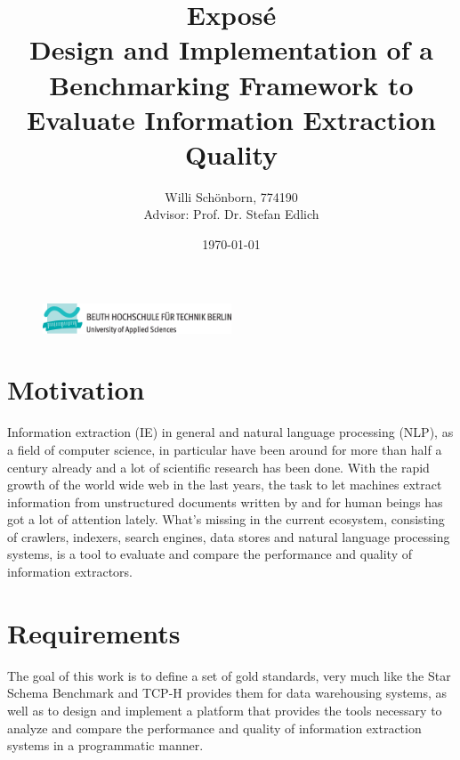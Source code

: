 \documentclass[a4paper]{article}
\title{\textbf{Exposé} \\ Design and Implementation of a \\ Benchmarking Framework to \\ Evaluate Information Extraction Quality}
\author{Willi Schönborn, 774190 \\ Advisor: Prof. Dr. Stefan Edlich}
\date{\today}
\begin{document}
\begin{figure}[H]
\centering
\includegraphics[width=0.5\textwidth]{beuth.eps}
\maketitle
\end{figure}

\section{Motivation}
Information extraction (IE) in general and natural language processing (NLP), as a field of computer science, in particular have been around for more than half a century already and a lot of scientific research has been done. With the rapid growth of the world wide web in the last years, the task to let machines extract information from unstructured documents written by and for human beings has got a lot of attention lately.  What's missing in the current ecosystem, consisting of crawlers, indexers, search engines, data stores and natural language processing systems, is a tool to evaluate and compare the performance and quality of information extractors. \\

\section{Requirements}
The goal of this work is to define a set of gold standards, very much like the Star Schema Benchmark\cite{SSB} and TCP-H\cite{TCPH} provides them for data warehousing systems, as well as to design and implement a platform that provides the tools necessary to analyze and compare the performance and quality of information extraction systems in a programmatic manner. \\
\end{document}
